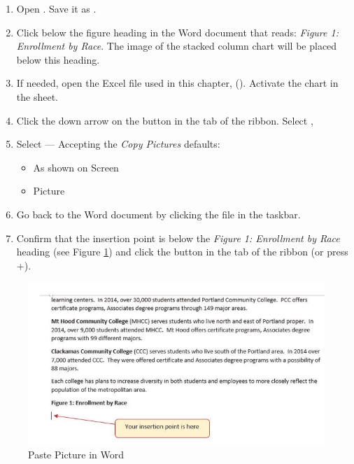 \begin{enumerate}
	\item Open . Save it as .
	\item Click below the figure heading in the Word document that reads: \textit{Figure 1: Enrollment by Race}. The image of the stacked column chart will be placed below this heading.
	\item If needed, open the Excel file used in this chapter,  (). Activate the  chart in the  sheet.
	\item Click the down arrow on the  button in the  tab of the ribbon. Select ,
	\item Select  --- Accepting the \textit{Copy Pictures} defaults:
	
	\begin{itemize}
		\item As shown on Screen
		\item Picture
	\end{itemize}	

	\item Go back to the  Word document by clicking the file in the taskbar.
	\item Confirm that the insertion point is below the \textit{Figure 1: Enrollment by Race} heading (see Figure \ref{04:fig43}) and click the  button in the  tab of the ribbon (or press +).
\end{enumerate}

\begin{figure}[H]
	\centering
	\includegraphics[width=\maxwidth{.95\linewidth}]{gfx/ch04_fig43}
	\caption{Paste Picture in Word}
	\label{04:fig43}
\end{figure}

